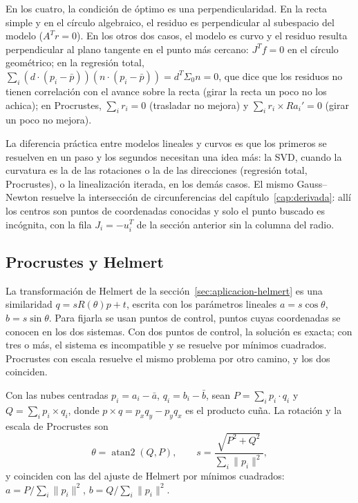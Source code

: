 En los cuatro, la condición de óptimo es una perpendicularidad. En la recta simple y en el
círculo algebraico, el residuo es perpendicular al subespacio del modelo (\(A^Tr=0\)). En
los otros dos casos, el modelo es curvo y el residuo resulta perpendicular al plano tangente
en el punto más cercano: \(J^Tf=0\) en el círculo geométrico; en la regresión total,
\(\sum_i(d\cdot(p_i-\bar p))(n\cdot(p_i-\bar p))=d^T\Sigma_0n=0\), que dice que los residuos no
tienen correlación con el avance sobre la recta (girar la recta un poco no los achica); en
Procrustes, \(\sum_ir_i=0\) (trasladar no mejora) y
\(\sum_ir_i\times Ra_i'=0\) (girar un poco no mejora).

La diferencia práctica entre modelos lineales y curvos es que los primeros se resuelven en
un paso y los segundos necesitan una idea más: la SVD, cuando la curvatura es la de las
rotaciones o la de las direcciones (regresión total, Procrustes), o la linealización
iterada, en los demás casos. El mismo Gauss--Newton resuelve la intersección de
circunferencias del capítulo~\ref{cap:derivada}: allí los centros son puntos de coordenadas
conocidas y solo el punto buscado es incógnita, con la fila \(J_i=-u_i^T\) de la sección
anterior sin la columna del radio.

\subsection{Procrustes y Helmert}

La transformación de Helmert de la sección~\ref{sec:aplicacion-helmert} es una similaridad
\(q=sR(\theta)p+t\), escrita con los parámetros lineales \(a=s\cos\theta\),
\(b=s\sin\theta\). Para fijarla se usan puntos de control, puntos cuyas coordenadas se conocen
en los dos sistemas. Con dos puntos de control, la solución es exacta; con tres o más, el
sistema es incompatible y se resuelve por mínimos cuadrados. Procrustes con escala resuelve
el mismo problema por otro camino, y los dos coinciden.

\begin{proposicion}\label{prop:cp-procrustes-helmert}
Con las nubes centradas \(p_i=a_i-\bar a\), \(q_i=b_i-\bar b\), sean
\(P=\sum_ip_i\cdot q_i\) y \(Q=\sum_ip_i\times q_i\), donde
\(p\times q=p_xq_y-p_yq_x\) es el producto cuña. La rotación y la escala de Procrustes son
\[
  \theta=\operatorname{atan2}(Q,P),\qquad s=\frac{\sqrt{P^2+Q^2}}{\sum_i\lVert p_i\rVert^2},
\]
y coinciden con las del ajuste de Helmert por mínimos cuadrados:
\(a=P/\sum_i\lVert p_i\rVert^2\), \(b=Q/\sum_i\lVert p_i\rVert^2\).
\end{proposicion}

